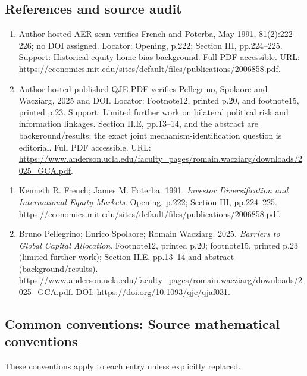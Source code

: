 \documentclass[11pt,a4paper]{article}
\begin{document}
\subsection*{References and source audit}
\begin{enumerate}
\item Author-hosted AER scan verifies French and Poterba, May 1991, 81(2):222--226; no DOI assigned. Locator: Opening, p.222; Section III, pp.224--225. Support: Historical equity home-bias background. Full PDF accessible. URL: \url{https://economics.mit.edu/sites/default/files/publications/2006858.pdf}.
\item Author-hosted published QJE PDF verifies Pellegrino, Spolaore and Wacziarg, 2025 and DOI. Locator: Footnote12, printed p.20, and footnote15, printed p.23. Support: Limited further work on bilateral political risk and information linkages. Section II.E, pp.13--14, and the abstract are background/results; the exact joint mechanism-identification question is editorial. Full PDF accessible. URL: \url{https://www.anderson.ucla.edu/faculty_pages/romain.wacziarg/downloads/2025_GCA.pdf}.
\end{enumerate}
\begin{enumerate}\raggedright
\item\hypertarget{definitions:source:30007620:1}{} Kenneth R. French; James M. Poterba. 1991. \emph{Investor Diversification and International Equity Markets}. Opening, p.222; Section III, pp.224--225.
\url{https://economics.mit.edu/sites/default/files/publications/2006858.pdf}.
\item\hypertarget{definitions:source:30007620:2}{} Bruno Pellegrino; Enrico Spolaore; Romain Wacziarg. 2025. \emph{Barriers to Global Capital Allocation}. Footnote12, printed p.20; footnote15, printed p.23 (limited further work); Section II.E, pp.13--14 and abstract (background/results).
\url{https://www.anderson.ucla.edu/faculty_pages/romain.wacziarg/downloads/2025_GCA.pdf}.
DOI: \url{https://doi.org/10.1093/qje/qjaf031}.
\end{enumerate}

\subsection*{Common conventions: Source mathematical conventions}

These conventions apply to each entry unless explicitly replaced.
\end{document}
